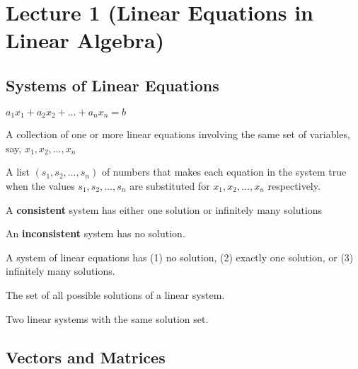
\section[Lecture 1 (16 August 2023) -- {\it Linear Equations in Linear Algebra}]{Lecture 1 (Linear Equations in Linear Algebra)}

\subsection{Systems of Linear Equations}

\begin{definition}
    $a_1 x_1 + a_2 x_2 + \ldots + a_n x_n = b$

\end{definition}

\begin{definition}
    A collection of one or more linear equations involving the same set of variables, say, $x_1, x_2, \ldots, x_n$
    
\end{definition}

\begin{definition}
    A list $\left( s_1, s_2, \ldots, s_n  \right)$ of numbers that makes each equation in the system true when the values $s_1, s_2, \ldots, s_n$ are substituted for $x_1, x_2, \ldots, x_n$ respectively.

    A \textbf{consistent} system has either one solution or infinitely many solutions

    An \textbf{inconsistent} system has no solution.
\end{definition}

\begin{theorem}
    A system of linear equations has (1) no solution, (2) exactly one solution, or (3) infinitely many solutions.
\end{theorem}

\begin{definition}
    The set of all possible solutions of a linear system.
\end{definition}

\begin{definition}
    Two linear systems with the same solution set.
\end{definition}

\subsection{Vectors and Matrices}

